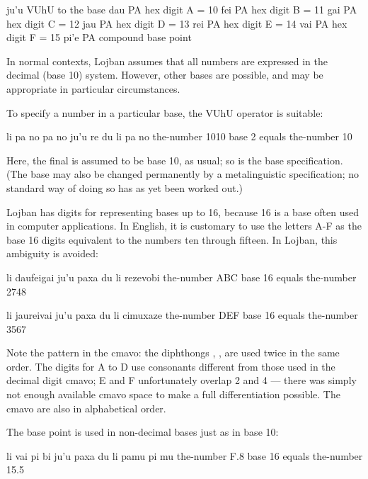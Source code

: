    ju'u    VUhU    to the base
    dau PA  hex digit A = 10
    fei PA  hex digit B = 11
    gai PA  hex digit C = 12
    jau PA  hex digit D = 13
    rei PA  hex digit E = 14
    vai PA  hex digit F = 15
    pi'e    PA  compound base point

In normal contexts, Lojban assumes that all numbers are
    expressed in the decimal (base 10) system. However, other bases
    are possible, and may be appropriate in particular
    circumstances. 

To specify a number in a particular base, the VUhU operator
     is suitable:
\begin{example}
li pa no pa no ju'u re du li pa no\n
the-number 1010 base 2 equals the-number 10
\end{example}

Here, the final  is assumed to be base 10, as usual;
    so is the base specification. (The base may also be changed
    permanently by a metalinguistic specification; no standard way
    of doing so has as yet been worked out.) 

Lojban has digits for representing bases up to 16, because
    16 is a base often used in computer applications. In English,
    it is customary to use the letters A-F as the base 16 digits
    equivalent to the numbers ten through fifteen. In Lojban, this
    ambiguity is avoided:
\begin{example}
li daufeigai ju'u paxa du li rezevobi\n
the-number ABC base 16 equals the-number 2748
\end{example}

\begin{example}
li jaureivai ju'u paxa du li cimuxaze\n
the-number DEF base 16 equals the-number 3567
\end{example}

Note the pattern in the cmavo: the diphthongs , ,
     are used twice in the same order. The digits for A to D
    use consonants different from those used in the decimal digit
    cmavo; E and F unfortunately overlap 2 and 4 --- there was
    simply not enough available cmavo space to make a full
    differentiation possible. The cmavo are also in alphabetical
    order. 

The base point  is used in non-decimal bases just as
    in base 10:
\begin{example}
li vai pi bi ju'u paxa du li pamu pi mu\n
the-number F.8 base 16 equals the-number 15.5
\end{example}

